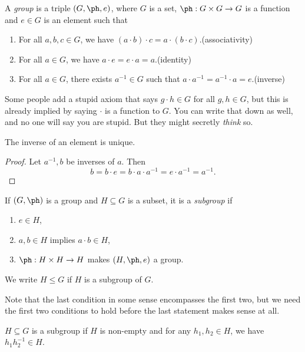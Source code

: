 \documentclass[a4paper]{article}
\begin{document}
\begin{defi}[Group]
  A \emph{group} is a triple $(G, \ph, e)$, where $G$ is a set, $\ph: G\times G \to G$ is a function and $e \in G$ is an element such that
  \begin{enumerate}
    \item For all $a, b, c \in G$, we have $(a \cdot b) \cdot c = a \cdot (b \cdot c)$.\hfill (associativity)
    \item For all $a \in G$, we have $a \cdot e = e \cdot a = a$.\hfill (identity)
    \item For all $a \in G$, there exists $a^{-1} \in G$ such that $a \cdot a^{-1} = a^{-1} \cdot a = e$.\hfill (inverse)
  \end{enumerate}
\end{defi}
Some people add a stupid axiom that says $g \cdot h \in G$ for all $g, h \in G$, but this is already implied by saying $\cdot$ is a function to $G$. You can write that down as well, and no one will say you are stupid. But they might secretly \emph{think} so.

\begin{lemma}
  The inverse of an element is unique.
\end{lemma}

\begin{proof}
  Let $a^{-1}, b$ be inverses of $a$. Then
  \[
    b = b \cdot e = b \cdot a \cdot a^{-1} = e \cdot a^{-1} = a^{-1}.
  \]
\end{proof}

\begin{defi}[Subgroup]
  If $(G, \ph)$ is a group and $H \subseteq G$ is a subset, it is a \emph{subgroup} if
  \begin{enumerate}
    \item $e \in H$,
    \item $a, b \in H$ implies $a\cdot b\in H$,
    \item $\ph: H \times H \to H$ makes $(H, \ph, e)$ a group.
  \end{enumerate}
  We write $H \leq G$ if $H$ is a subgroup of $G$.
\end{defi}
Note that the last condition in some sense encompasses the first two, but we need the first two conditions to hold before the last statement makes sense at all.

\begin{lemma}
  $H \subseteq G$ is a subgroup if $H$ is non-empty and for any $h_1, h_2 \in H$, we have $h_1h_2^{-1} \in H$.
\end{lemma}
\end{document}
